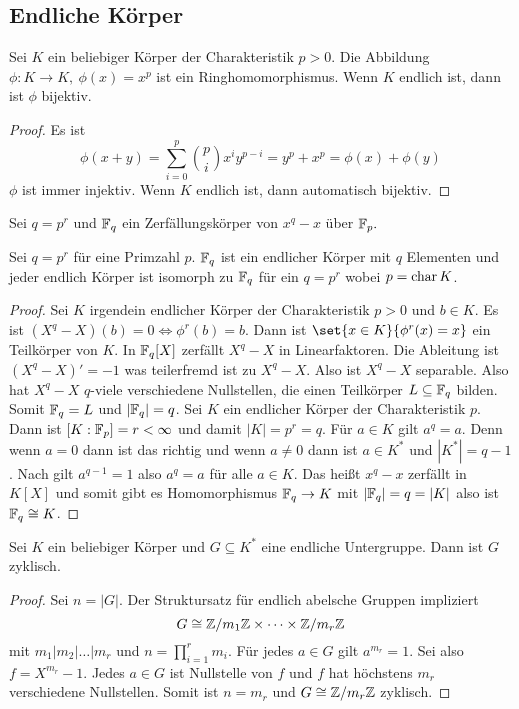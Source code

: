 \subsection{Endliche Körper}
\begin{Lemma}
    Sei \(K\) ein beliebiger Körper der Charakteristik \(p>0\). Die Abbildung 
    \(\phi\colon K\to K,\ \phi(x)=x^p\) ist ein Ringhomomorphismus.
     Wenn \(K\) endlich ist, dann ist
     \(\phi\) bijektiv.
\end{Lemma}
\begin{proof}
    Es ist \[\phi(x+y)=\sum_{i=0}^p\binom{p}{i}x^iy^{p-i}=y^p+x^p=\phi(x)+\phi(y)\]
    \(\phi\) ist immer injektiv. Wenn \(K\) endlich ist, dann automatisch bijektiv.
\end{proof}
\begin{Def}
    Sei \(q=p^r\) und \(\mathbb{F}_q\) ein Zerfällungskörper von \(x^q-x\) über \(\mathbb{F}_p.\)
\end{Def}
\begin{Satz} Sei \(q=p^r\) für eine Primzahl \(p\).
    \(\mathbb{F}_q\) ist ein endlicher Körper mit \(q\) Elementen und jeder endlich Körper ist isomorph zu \(\mathbb{F}_q\) für ein \(q=p^r\) wobei \(p=\operatorname{char} K\).
\end{Satz}
\begin{proof}
    Sei \(K\) irgendein endlicher Körper der Charakteristik \(p>0\) und \(b\in K\). Es ist \((X^q-X)(b)=0\iff \phi^r(b)=b\). Dann ist \(\set{x\in K}{ \phi^r(x)=x}\) ein Teilkörper von \(K\).
    In \(\mathbb{F}_q[X]\) zerfällt \(X^q-X\) in Linearfaktoren. Die Ableitung ist \((X^q-X)'=-1\) was teilerfremd ist zu \(X^q-X\). Also ist \(X^q-X\) separable. Also hat \(X^q-X\) \(q\)-viele verschiedene Nullstellen, die einen Teilkörper \(L\subseteq \mathbb{F}_q\) bilden. Somit \(\mathbb{F}_q=L\) und \(|\mathbb{F}_q|=q\).
    Sei \(K\) ein endlicher Körper der Charakteristik \(p\). Dann ist \([K:\mathbb{F}_p]=r<\infty\) und damit \(|K|=p^r=q\).
    Für \(a\in K\) gilt \(a^q=a\). Denn wenn \(a=0\) dann ist das richtig und wenn \(a\neq 0\) dann ist \(a\in K^*\) und \(|K^*|=q-1\). Nach  gilt \(a^{q-1}=1\) also \(a^q=a\) für alle \(a\in K\). Das heißt \(x^q-x\) zerfällt in \(K[X]\) und somit gibt es Homomorphismus \(\mathbb{F}_q\to K\) mit \(|\mathbb{F}_q|=q=|K|\) also ist \(\mathbb{F}_q\cong K\).
\end{proof}
\begin{Satz}
    Sei \(K\) ein beliebiger Körper und \(G\subseteq K^*\) eine endliche Untergruppe. Dann ist \(G\) zyklisch.
\end{Satz}
\begin{proof}
    Sei \(n=|G|\). Der Struktursatz für endlich abelsche Gruppen impliziert 
    \[G\cong \mathbb{Z}/m_1\mathbb{Z}\times \dots\times \mathbb{Z}/m_r\mathbb{Z}\] mit \(m_1|m_2|\dots| m_r\) und \(n=\prod_{i=1}^rm_i\).
    Für jedes \(a\in G\) gilt \(a^{m_r}=1\). Sei also \(f=X^{m_r}-1\). Jedes \(a\in G\) ist Nullstelle von \(f\) und \(f\) hat höchstens \(m_r\) verschiedene Nullstellen. Somit ist \(n=m_r\) und \(G\cong \mathbb{Z}/m_r\mathbb{Z}\) zyklisch.

\end{proof}
